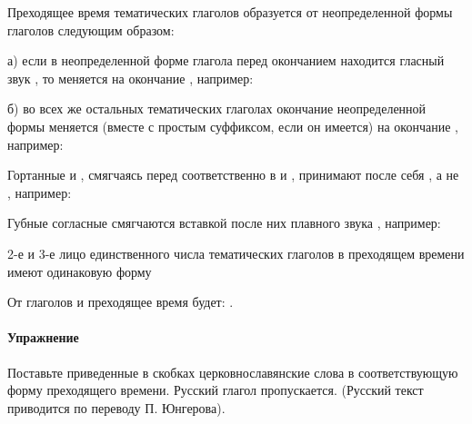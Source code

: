 \documentclass[11pt,a4paper,oneside]{memoir}
\begin{document}
    Преходящее время тематических глаголов образуется от неопределенной формы глаголов следующим образом:
    
    а) если в неопределенной форме глагола перед окончанием {} находится гласный звук {}, то {} меняется на окончание {}, например:

    \bigskip{}

    б) во всех же остальных тематических глаголах окончание неопределенной формы {} меняется (вместе с простым суффиксом, если он имеется) на окончание {}, например:

    \bigskip{}

    Гортанные {} и {}, смягчаясь перед {} соответственно в {} и {}, принимают после себя {}, а не {}, например:

    \bigskip{}

    Губные согласные смягчаются вставкой после них плавного звука {}, например:

    \bigskip{}

    2-е и 3-е лицо единственного числа тематических глаголов в преходящем времени имеют одинаковую форму
    
    От глаголов {} и {} преходящее время будет: {}.

                    \paragraph{Упражнение}
                    
    Поставьте приведенные в скобках церковнославянские слова в соответствующую форму преходящего времени. Русский глагол пропускается. (Русский текст приводится по переводу П. Юнгерова).
    
\end{document}
